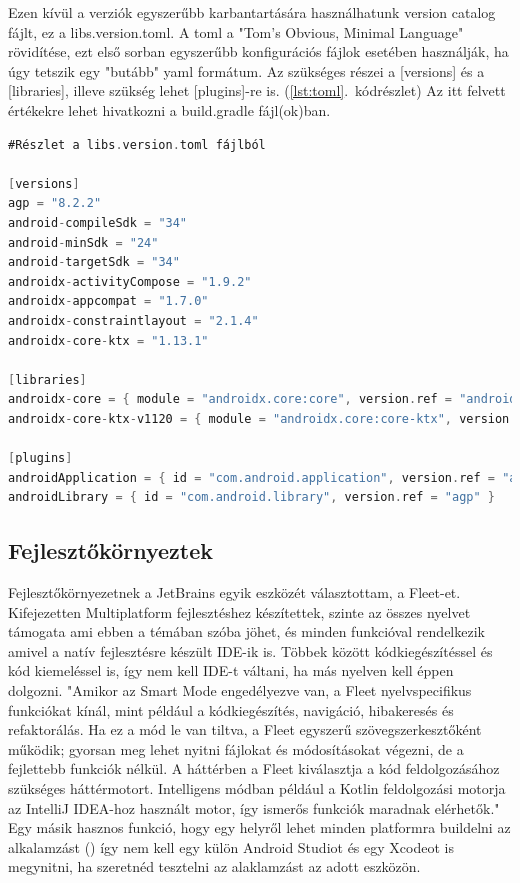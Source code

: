 Ezen kívül a verziók egyszerűbb karbantartására használhatunk version catalog fájlt, ez a libs.version.toml.
A toml a "Tom's Obvious, Minimal Language" rövidítése, ezt első sorban egyszerűbb konfigurációs fájlok esetében használják, ha úgy tetszik egy "butább" yaml formátum.
Az szükséges részei a [versions] és a [libraries], illeve szükség lehet [plugins]-re is. (\ref{lst:toml}.~kódrészlet) Az itt felvett értékekre lehet hivatkozni a build.gradle fájl(ok)ban.

\begin{lstlisting}[caption={Version catalog}, label={lst:toml}, language=Kotlin]
#Részlet a libs.version.toml fájlból

[versions]
agp = "8.2.2"
android-compileSdk = "34"
android-minSdk = "24"
android-targetSdk = "34"
androidx-activityCompose = "1.9.2"
androidx-appcompat = "1.7.0"
androidx-constraintlayout = "2.1.4"
androidx-core-ktx = "1.13.1"

[libraries]
androidx-core = { module = "androidx.core:core", version.ref = "androidx-core-ktx" }
androidx-core-ktx-v1120 = { module = "androidx.core:core-ktx", version.ref = "coreKtx" }

[plugins]
androidApplication = { id = "com.android.application", version.ref = "agp" }
androidLibrary = { id = "com.android.library", version.ref = "agp" }
\end{lstlisting}


\subsection{Fejlesztőkörnyeztek}

Fejlesztőkörnyezetnek a JetBrains egyik eszközét választottam, a Fleet-et.
Kifejezetten Multiplatform fejlesztéshez készítettek, szinte az összes nyelvet támogata ami ebben a témában szóba jöhet, és minden funkcióval rendelkezik amivel a natív fejlesztésre készült IDE-ik is.
Többek között kódkiegészítéssel és kód kiemeléssel is, így nem kell IDE-t váltani, ha más nyelven kell éppen dolgozni.
"Amikor az Smart Mode engedélyezve van, a Fleet nyelvspecifikus funkciókat kínál, mint például a kódkiegészítés, navigáció, hibakeresés és refaktorálás. Ha ez a mód le van tiltva, a Fleet egyszerű szövegszerkesztőként működik; gyorsan meg lehet nyitni fájlokat és módosításokat végezni, de a fejlettebb funkciók nélkül. A háttérben a Fleet kiválasztja a kód feldolgozásához szükséges háttérmotort. Intelligens módban például a Kotlin feldolgozási motorja az IntelliJ IDEA-hoz használt motor, így ismerős funkciók maradnak elérhetők." \cite{Fleet}
Egy másik hasznos funkció, hogy egy helyről lehet minden platformra buildelni az alkalamzást () így nem kell egy külön Android Studiot és egy Xcodeot is megynitni, ha szeretnéd tesztelni az alaklamzást az adott eszközön.

